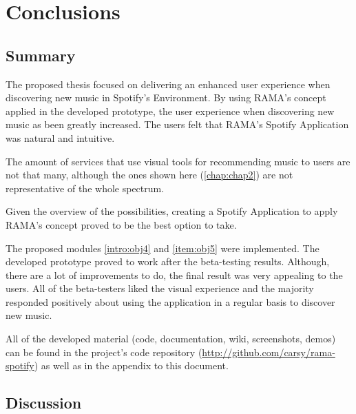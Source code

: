 
\chapter{Conclusions}
\label{chap:chap5}

\section*{}


\section{Summary} %
\label{sec:summary}

  The proposed thesis focused on delivering an enhanced user experience when discovering new music in Spotify's Environment.
  By using RAMA's concept applied in the developed prototype, the user experience when discovering new music as been greatly increased.
  The users felt that RAMA's Spotify Application was natural and intuitive.

  The amount of services that use visual tools for recommending music to users are not that many, although the ones shown here (\ref{chap:chap2}) are not representative of the whole spectrum.

  Given the overview of the possibilities, creating a Spotify Application to apply RAMA's concept proved to be the best option to take.

  The proposed modules \ref{intro:obj4} and \ref{item:obj5} were implemented.
  The developed prototype proved to work after the beta-testing results.
  Although, there are a lot of improvements to do, the final result was very appealing to the users.
  All of the beta-testers liked the visual experience and the majority responded positively about using the application in a regular basis to discover new music.

  All of the developed material (code, documentation, wiki, screenshots, demos) can be found in the project's code repository (\url{http://github.com/carsy/rama-spotify}) as well as in the appendix to this document.



\section{Discussion} %
\label{sec:discussion}

